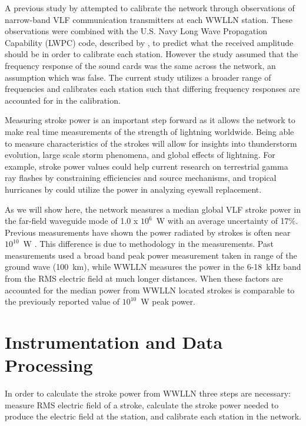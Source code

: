 A previous study by \citet{Rodger2006} attempted to calibrate the network through observations of narrow-band VLF communication transmitters at each WWLLN station.
These observations were combined with the U.S. Navy Long Wave Propagation Capability (LWPC) code, described by \citet{Ferguson1998}, to predict what the received amplitude should be in order to calibrate each station.
However the study assumed that the frequency response of the sound cards was the same across the network, an assumption which was false.
The current study utilizes a broader range of frequencies and calibrates each station such that differing frequency responses are accounted for in the calibration.

Measuring stroke power is an important step forward as it allows the network to make real time measurements of the strength of lightning worldwide.
Being able to measure characteristics of the strokes will allow for insights into thunderstorm evolution, large scale storm phenomena, and global effects of lightning.
For example, stroke power values could help current research on terrestrial gamma ray flashes by \citet{Briggs2011} constraining efficiencies and source mechanisms, and tropical hurricanes by \citet{Thomas2010d} could utilize the power in analyzing eyewall replacement.

As we will show here, the network measures a median global VLF stroke power in the far-field waveguide mode of 1.0 x $10^6$~W with an average uncertainty of 17\%.
Previous measurements have shown the power radiated by strokes is often near $10^{10}$~W \citep{Krider1983}. This difference is due to methodology in the measurements.
Past measurements used a broad band peak power measurement taken in range of the ground wave (100~km), while WWLLN measures the power in the 6-18~kHz band from the RMS electric field at much longer distances.
When these factors are accounted for the median power from WWLLN located strokes is comparable to the previously reported value of $10^{10}$~W peak power.

\section{Instrumentation and Data Processing}

In order to calculate the stroke power from WWLLN three steps are necessary: measure RMS electric field of a stroke, calculate the stroke power needed to produce the electric field at the station, and calibrate each station in the network.

